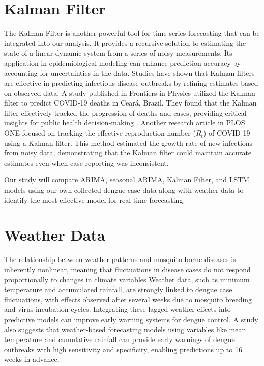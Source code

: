 \section{Kalman Filter}
The Kalman Filter is another powerful tool for time-series forecasting that can be integrated into our analysis. It provides a recursive solution to estimating the state of a linear dynamic system from a series of noisy measurements. Its application in epidemiological modeling can enhance prediction accuracy by accounting for uncertainties in the data\cite{li2022applications}. Studies have shown that Kalman filters are effective in predicting infectious disease outbreaks by refining estimates based on observed data. A study published in Frontiers in Physics utilized the Kalman filter to predict COVID-19 deaths in Ceará, Brazil. They found that the Kalman filter effectively tracked the progression of deaths and cases, providing critical insights for public health decision-making \cite{ahmadini2021analysis}. Another research article in PLOS ONE focused on tracking the effective reproduction number ($R_t$) of COVID-19 using a Kalman filter. This method estimated the growth rate of new infections from noisy data, demonstrating that the Kalman filter could maintain accurate estimates even when case reporting was inconsistent\cite{arroyo2021tracking}.

Our study will compare ARIMA, seasonal ARIMA, Kalman Filter, and LSTM models using our own collected dengue case data along with weather data to identify the most effective model for real-time forecasting.

\section{Weather Data}
The relationship between weather patterns and mosquito-borne diseases is inherently nonlinear, meaning that fluctuations in disease cases do not respond proportionally to changes in climate variables\cite{colon2013effects} Weather data, such as minimum temperature and accumulated rainfall, are strongly linked to dengue case fluctuations, with effects observed after several weeks due to mosquito breeding and virus incubation cycles. Integrating these lagged weather effects into predictive models can improve early warning systems for dengue control\cite{cheong2013assessing}. A study also suggests that weather-based forecasting models using variables like mean temperature and cumulative rainfall can provide early warnings of dengue outbreaks with high sensitivity and specificity, enabling predictions up to 16 weeks in advance\cite{hii2012forecast}.

